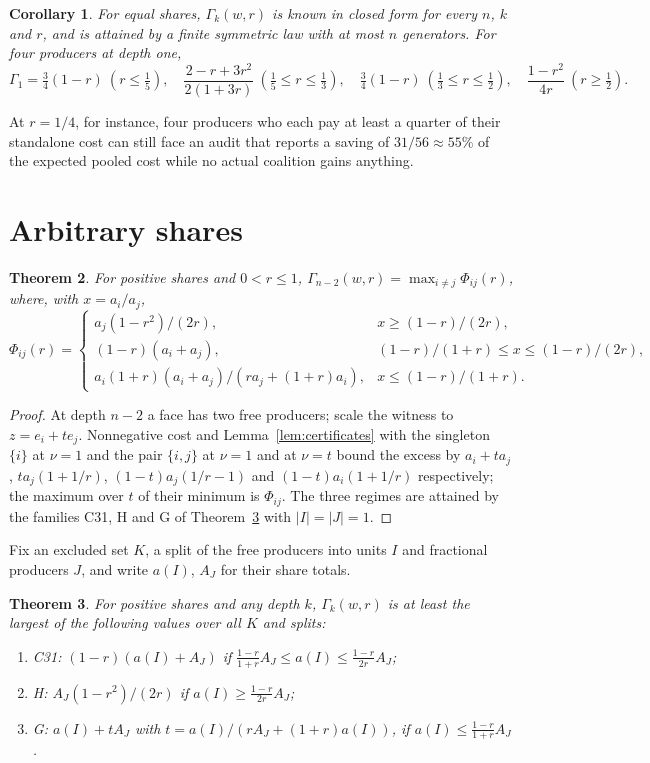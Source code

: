 \documentclass[11pt,a4paper]{article}
\newtheorem{theorem}{Theorem}
\newtheorem{corollary}[theorem]{Corollary}
\theoremstyle{remark}
\begin{document}
\begin{corollary}\label{cor:complete}
For equal shares, $\Gamma_k(w,r)$ is known in closed form for every $n$, $k$ and
$r$, and is attained by a finite symmetric law with at most $n$ generators. For
four producers at depth one,
\[
\Gamma_1=\tfrac34(1-r)\ (r\le\tfrac15),\quad
\frac{2-r+3r^2}{2(1+3r)}\ (\tfrac15\le r\le\tfrac13),\quad
\tfrac34(1-r)\ (\tfrac13\le r\le\tfrac12),\quad
\frac{1-r^2}{4r}\ (r\ge\tfrac12).
\]
\end{corollary}

At $r=1/4$, for instance, four producers who each pay at least a quarter of
their standalone cost can still face an audit that reports a saving of
$31/56\approx55\%$ of the expected pooled cost while no actual coalition
gains anything.

\section{Arbitrary shares}

\begin{theorem}\label{thm:lastdepth}
For positive shares and $0<r\le1$, $\Gamma_{n-2}(w,r)=\max_{i\ne j}\Phi_{ij}(r)$,
where, with $x=a_i/a_j$,
\[
\Phi_{ij}(r)=
\begin{cases}
a_j(1-r^2)/(2r), & x\ge(1-r)/(2r),\\
(1-r)(a_i+a_j), & (1-r)/(1+r)\le x\le(1-r)/(2r),\\
a_i(1+r)(a_i+a_j)/(ra_j+(1+r)a_i), & x\le(1-r)/(1+r).
\end{cases}
\]
\end{theorem}

\begin{proof}
At depth $n-2$ a face has two free producers; scale the witness to
$z=e_i+te_j$. Nonnegative cost and Lemma~\ref{lem:certificates} with the
singleton $\{i\}$ at $\nu=1$ and the pair $\{i,j\}$ at $\nu=1$ and at $\nu=t$
bound the excess by $a_i+ta_j$, $ta_j(1+1/r)$, $(1-t)a_j(1/r-1)$ and
$(1-t)a_i(1+1/r)$ respectively; the maximum over $t$ of their minimum is
$\Phi_{ij}$. The three regimes
are attained by the families C31, H and G of Theorem~\ref{thm:families} with
$|I|=|J|=1$.
\end{proof}

Fix an excluded set $K$, a split of the free producers into units $I$ and
fractional producers $J$, and write $a(I)$, $A_J$ for their share totals.

\begin{theorem}\label{thm:families}
For positive shares and any depth $k$, $\Gamma_k(w,r)$ is at least the largest
of the following values over all $K$ and splits:
\begin{enumerate}[label=(\alph*)]
\item C31: $(1-r)(a(I)+A_J)$ if $\frac{1-r}{1+r}A_J\le a(I)\le\frac{1-r}{2r}A_J$;
\item H: $A_J(1-r^2)/(2r)$ if $a(I)\ge\frac{1-r}{2r}A_J$;
\item G: $a(I)+tA_J$ with $t=a(I)/(rA_J+(1+r)a(I))$, if
$a(I)\le\frac{1-r}{1+r}A_J$.
\end{enumerate}
\end{theorem}
\end{document}
